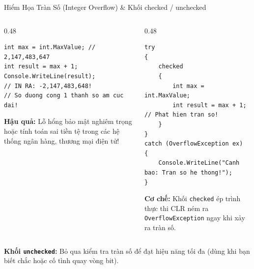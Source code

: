 \documentclass[aspectratio=169, 10pt]{beamer}
\begin{document}
\begin{frame}[fragile]{Hiểm Họa Tràn Số (Integer Overflow) \& Khối checked / unchecked}
  \begin{columns}[T]
    \begin{column}{0.48\textwidth}
      \begin{tcolorbox}[colback=AlertRed!10,colframe=AlertRed,title=\textbf{Mặc định trong C\#: Tràn số âm thầm!},fonttitle=\small\bfseries]
\begin{lstlisting}[numbers=none]
int max = int.MaxValue; // 2,147,483,647
int result = max + 1;
Console.WriteLine(result); 
// IN RA: -2,147,483,648!
// So duong cong 1 thanh so am cuc dai!
\end{lstlisting}
        \footnotesize \textbf{Hậu quả:} Lỗ hổng bảo mật nghiêm trọng hoặc tính toán sai tiền tệ trong các hệ thống ngân hàng, thương mại điện tử!
      \end{tcolorbox}
    \end{column}

    \begin{column}{0.48\textwidth}
      \begin{tcolorbox}[colback=UniGreen!10,colframe=UniGreen,title=\textbf{Giải pháp bảo vệ: Khối \texttt{checked}},fonttitle=\small\bfseries]
\begin{lstlisting}[numbers=none]
try
{
    checked
    {
        int max = int.MaxValue;
        int result = max + 1; // Phat hien tran so!
    }
}
catch (OverflowException ex)
{
    Console.WriteLine("Canh bao: Tran so he thong!");
}
\end{lstlisting}
        \footnotesize \textbf{Cơ chế:} Khối \texttt{checked} ép trình thực thi CLR ném ra \texttt{OverflowException} ngay khi xảy ra tràn số.
      \end{tcolorbox}
    \end{column}
  \end{columns}

  \begin{center}
    \small \textbf{Khối \texttt{unchecked}:} Bỏ qua kiểm tra tràn số để đạt hiệu năng tối đa (dùng khi bạn biết chắc hoặc cố tình quay vòng bit).
  \end{center}
\end{frame}
\end{document}
